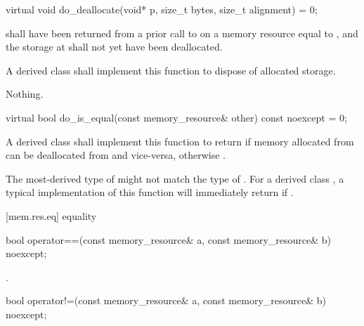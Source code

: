 %
\begin{itemdecl}
virtual void do_deallocate(void* p, size_t bytes, size_t alignment) = 0;
\end{itemdecl}

\begin{itemdescr}
\pnum
\requires
{} shall have been returned from a prior call to  on a memory resource equal to ,
and the storage at  shall not yet have been deallocated.

\pnum
\effects
A derived class shall implement this function to dispose of allocated storage.

\pnum
\throws
Nothing.
\end{itemdescr}

%
\begin{itemdecl}
virtual bool do_is_equal(const memory_resource& other) const noexcept = 0;
\end{itemdecl}

\begin{itemdescr}
\pnum
\returns
A derived class shall implement this function to return  if memory allocated from  can be deallocated from  and vice-versa,
otherwise .
\begin{note}
The most-derived type of  might not match the type of .
For a derived class , a typical implementation of this function
will immediately return 
if .\end{note}
\end{itemdescr}

[mem.res.eq]{ equality}

%
\begin{itemdecl}
bool operator==(const memory_resource& a, const memory_resource& b) noexcept;
\end{itemdecl}

\begin{itemdescr}
\pnum
\returns
{}.
\end{itemdescr}

%
\begin{itemdecl}
bool operator!=(const memory_resource& a, const memory_resource& b) noexcept;
\end{itemdecl}

